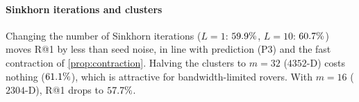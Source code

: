 \paragraph*{Sinkhorn iterations and clusters}
Changing the number of Sinkhorn iterations ($L=1$: $59.9\%$, $L=10$: $60.7\%$) moves R@1 by
less than seed noise, in line with prediction (P3) and the fast contraction of
\cref{prop:contraction}. Halving the clusters to $m=32$ ($4352$-D) costs nothing
($61.1\%$), which is attractive for bandwidth-limited rovers. With $m=16$ ($2304$-D), R@1
drops to $57.7\%$.

